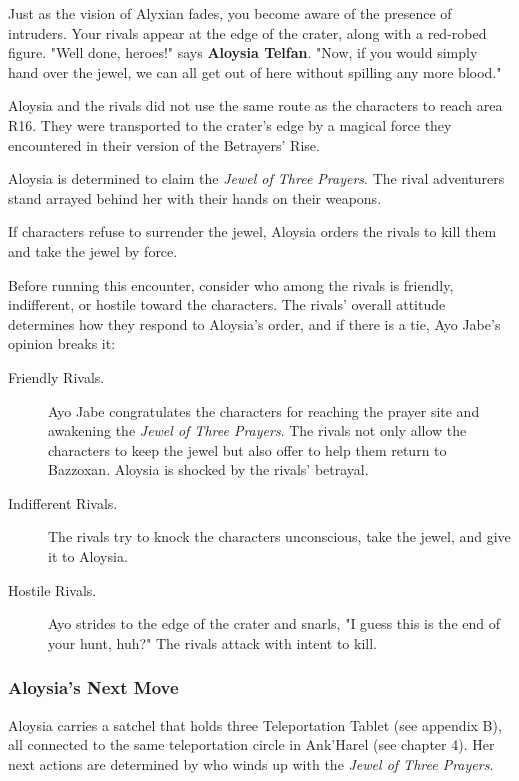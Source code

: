 \documentclass[10pt,a4paper,twoside,fancy,bg=print,twocolumn,openany,nodeprecatedcode]{dndbook}
\begin{document}
\begin{DndReadAloud}{}
Just as the vision of Alyxian fades, you become aware of the presence of intruders. Your rivals appear at the edge of the crater, along with a red-robed figure. "Well done, heroes!" says \textbf{Aloysia Telfan}. "Now, if you would simply hand over the jewel, we can all get out of here without spilling any more blood."

\end{DndReadAloud}

Aloysia and the rivals did not use the same route as the characters to reach area R16. They were transported to the crater's edge by a magical force they encountered in their version of the Betrayers' Rise.

Aloysia is determined to claim the \textit{Jewel of Three Prayers}. The rival adventurers stand arrayed behind her with their hands on their weapons.

If characters refuse to surrender the jewel, Aloysia orders the rivals to kill them and take the jewel by force.

Before running this encounter, consider who among the rivals is friendly, indifferent, or hostile toward the characters. The rivals' overall attitude determines how they respond to Aloysia's order, and if there is a tie, Ayo Jabe's opinion breaks it:


\begin{description}
\item[Friendly Rivals.]
Ayo Jabe congratulates the characters for reaching the prayer site and awakening the \textit{Jewel of Three Prayers}. The rivals not only allow the characters to keep the jewel but also offer to help them return to Bazzoxan. Aloysia is shocked by the rivals' betrayal.
\item[Indifferent Rivals.]
The rivals try to knock the characters unconscious, take the jewel, and give it to Aloysia.
\item[Hostile Rivals.]
Ayo strides to the edge of the crater and snarls, "I guess this is the end of your hunt, huh?" The rivals attack with intent to kill.
\end{description}

\subsubsection{Aloysia's Next Move}
Aloysia carries a satchel that holds three Teleportation Tablet (see appendix B), all connected to the same teleportation circle in Ank'Harel (see chapter 4). Her next actions are determined by who winds up with the \textit{Jewel of Three Prayers}.
\end{document}
